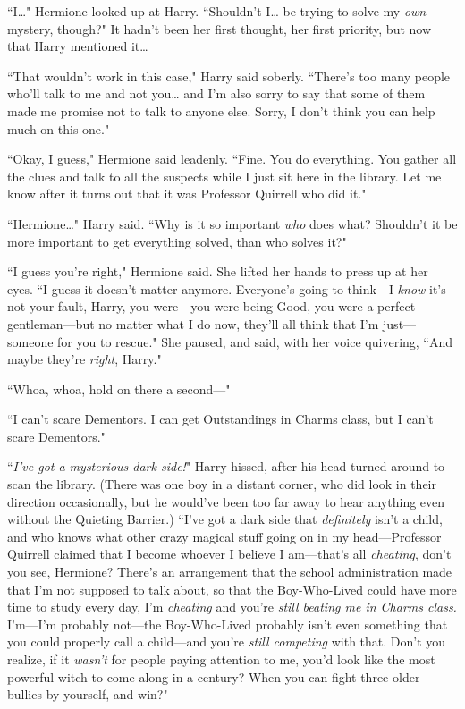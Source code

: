 ``I{\ldots}" Hermione looked up at Harry. ``Shouldn't I{\ldots} be trying to solve my \emph{own} mystery, though?" It hadn't been her first thought, her first priority, but now that Harry mentioned it{\ldots}

``That wouldn't work in this case," Harry said soberly. ``There's too many people who'll talk to me and not you{\ldots} and I'm also sorry to say that some of them made me promise not to talk to anyone else. Sorry, I don't think you can help much on this one."

``Okay, I guess," Hermione said leadenly. ``Fine. You do everything. You gather all the clues and talk to all the suspects while I just sit here in the library. Let me know after it turns out that it was Professor Quirrell who did it."

``Hermione{\ldots}" Harry said. ``Why is it so important \emph{who} does what? Shouldn't it be more important to get everything solved, than who solves it?"

``I guess you're right," Hermione said. She lifted her hands to press up at her eyes. ``I guess it doesn't matter anymore. Everyone's going to think—I \emph{know} it's not your fault, Harry, you were—you were being Good, you were a perfect gentleman—but no matter what I do now, they'll all think that I'm just—someone for you to rescue." She paused, and said, with her voice quivering, ``And maybe they're \emph{right}, Harry."

``Whoa, whoa, hold on there a second—"

``I can't scare Dementors. I can get Outstandings in Charms class, but I can't scare Dementors."

``\emph{I've got a mysterious dark side!}" Harry hissed, after his head turned around to scan the library. (There was one boy in a distant corner, who did look in their direction occasionally, but he would've been too far away to hear anything even without the Quieting Barrier.) ``I've got a dark side that \emph{definitely} isn't a child, and who knows what other crazy magical stuff going on in my head—Professor Quirrell claimed that I become whoever I believe I am—that's all \emph{cheating}, don't you see, Hermione? There's an arrangement that the school administration made that I'm not supposed to talk about, so that the Boy-Who-Lived could have more time to study every day, I'm \emph{cheating} and you're \emph{still beating me in Charms class.} I'm—I'm probably not—the Boy-Who-Lived probably isn't even something that you could properly call a child—and you're \emph{still competing} with that. Don't you realize, if it \emph{wasn't} for people paying attention to me, you'd look like the most powerful witch to come along in a century? When you can fight three older bullies by yourself, and win?"

